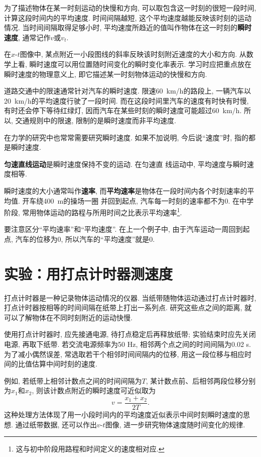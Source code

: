 \documentclass[11pt,a4paper]{ctexbook}
\begin{document}
为了描述物体在某一时刻运动的快慢和方向, 可以取包含这一时刻的很短一段时间, 计算这段时间内的平均速度. 时间间隔越短, 这个平均速度越能反映该时刻的运动情况. 当时间间隔取得足够小时, 平均速度所趋近的值叫作物体在这一时刻的\textbf{瞬时速度}, 通常记作$v$或$v_t$.

在$x$-$t$图像中, 某点附近一小段图线的斜率反映该时刻附近速度的大小和方向. 从数学上看, 瞬时速度可以用位置随时间变化的瞬时变化率表示. 学习时应把重点放在瞬时速度的物理意义上, 即它描述某一时刻物体运动的快慢和方向.

道路交通中的限速通常针对汽车的瞬时速度. 限速60\ km/h的路段上, 一辆汽车以20\ km/h的平均速度行驶了一段时间.
而在这段时间里汽车的速度有时快有时慢, 有时还会停下等待红绿灯, 因而汽车在某些时刻的瞬时速度可能超过60\ km/h.
所以, 交通规则中的限速, 限制的是瞬时速度而非平均速度.

在力学的研究中也常常需要研究瞬时速度. 如果不加说明, 今后说``速度''时, 指的都是瞬时速度.

\textbf{匀速直线运动}是瞬时速度保持不变的运动. 在匀速直
线运动中, 平均速度与瞬时速度相等.

瞬时速度的大小通常叫作\textbf{速率}, 而\textbf{平均速率}是物体在一段时间内各个时刻速率的平均值. 开车绕400\ m的操场一圈
并回到起点, 汽车每一时刻的速率都不为0. 在中学阶段, 常用物体运动的路程与所用时间之比表示平均速率\footnote{这与初中阶段用路程和时间定义的速度相对应.}.

要注意区分``平均速率''和``平均速度''. 在上一个例子中, 由于汽车运动一周回到起点, 汽车的位移为0,
所以汽车的``平均速度''就是0.



\section{实验：用打点计时器测速度}

打点计时器是一种记录物体运动情况的仪器. 当纸带随物体运动通过打点计时器时, 打点计时器按相等的时间间隔在纸带上打出一系列点. 研究这些点之间的距离, 就可以了解物体在不同时刻附近的运动快慢.

使用打点计时器时, 应先接通电源, 待打点稳定后再释放纸带; 实验结束时应先关闭电源, 再取下纸带. 若交流电源频率为50 Hz, 相邻两个点之间的时间间隔为0.02 s. 为了减小偶然误差, 常选取若干个相邻时间间隔内的位移, 用这一段位移与相应时间的比值估算中间时刻的速度.

例如, 若纸带上相邻计数点之间的时间间隔为$T$, 某计数点前、后相邻两段位移分别为$x_1$和$x_2$, 则该计数点附近的瞬时速度可近似取为
$$v=\frac{x_1+x_2}{2T}.$$
这种处理方法体现了用一小段时间内的平均速度近似表示中间时刻瞬时速度的思想. 通过纸带数据, 还可以作出$v$-$t$图像, 进一步研究物体速度随时间变化的规律.
\end{document}
